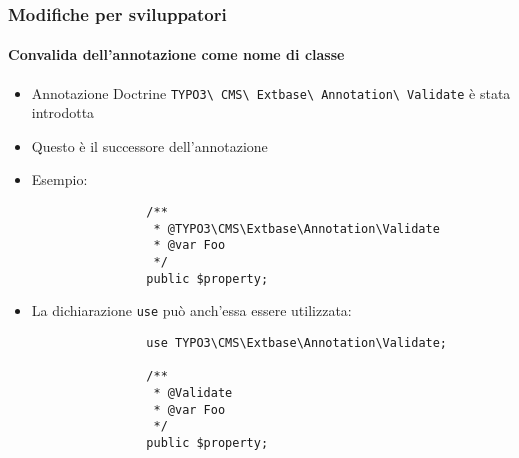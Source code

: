 
\begin{frame}[fragile]
	\frametitle{Modifiche per sviluppatori}
	\framesubtitle{Convalida dell'annotazione come nome di classe}

	\lstset{basicstyle=\tiny\ttfamily}

	\begin{itemize}
		\item Annotazione Doctrine
			\texttt{TYPO3\textbackslash
				CMS\textbackslash
				Extbase\textbackslash
				Annotation\textbackslash
				Validate} è stata introdotta
		\item Questo è il successore dell'annotazione \texttt{\@validate}
		\item Esempio:

			\begin{lstlisting}
				/**
				 * @TYPO3\CMS\Extbase\Annotation\Validate
				 * @var Foo
				 */
				public $property;
			\end{lstlisting}

		\item La dichiarazione \texttt{use} può anch'essa essere utilizzata:

			\begin{lstlisting}
				use TYPO3\CMS\Extbase\Annotation\Validate;

				/**
				 * @Validate
				 * @var Foo
				 */
				public $property;
			\end{lstlisting}

	\end{itemize}

\end{frame}


